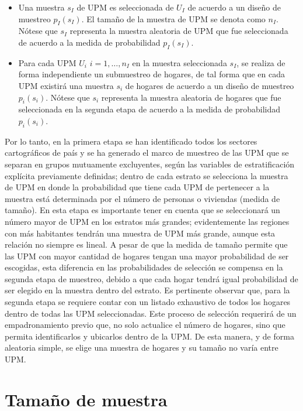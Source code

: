 \begin{itemize}
\tightlist
\item
  Una muestra \(s_I\) de UPM es seleccionada de \(U_I\) de acuerdo a un diseño de muestreo \(p_I(s_I)\). El tamaño de la muestra de UPM se denota como \(n_I\). Nótese que \(s_I\) representa la muestra aleatoria de UPM que fue seleccionada de acuerdo a la medida de probabilidad \(p_I(s_I)\).
\item
  Para cada UPM \(U_i\) \(i=1,\dots,n_I\) en la muestra seleccionada \(s_I\), se realiza de forma independiente un submuestreo de hogares, de tal forma que en cada UPM existirá una muestra \(s_i\) de hogares de acuerdo a un diseño de muestreo \(p_i(s_i)\). Nótese que \(s_i\) representa la muestra aleatoria de hogares que fue seleccionada en la segunda etapa de acuerdo a la medida de probabilidad \(p_i(s_i)\).
\end{itemize}

Por lo tanto, en la primera etapa se han identificado todos los sectores cartográficos de país y se ha generado el marco de muestreo de las UPM que se separan en grupos mutuamente excluyentes, según las variables de estratificación explícita previamente definidas; dentro de cada estrato se selecciona la muestra de UPM en donde la probabilidad que tiene cada UPM de pertenecer a la muestra está determinada por el número de personas o viviendas (medida de tamaño). En esta etapa es importante tener en cuenta que se seleccionará un número mayor de UPM en los estratos más grandes; evidentemente las regiones con más habitantes tendrán una muestra de UPM más grande, aunque esta relación no siempre es lineal. A pesar de que la medida de tamaño permite que las UPM con mayor cantidad de hogares tengan una mayor probabilidad de ser escogidas, esta diferencia en las probabilidades de selección se compensa en la segunda etapa de muestreo, debido a que cada hogar tendrá igual probabilidad de ser elegido en la muestra dentro del estrato. Es pertinente observar que, para la segunda etapa se requiere contar con un listado exhaustivo de todos los hogares dentro de todas las UPM seleccionadas. Este proceso de selección requerirá de un empadronamiento previo que, no solo actualice el número de hogares, sino que permita identificarlos y ubicarlos dentro de la UPM. De esta manera, y de forma aleatoria simple, se elige una muestra de hogares y su tamaño no varía entre UPM.

\hypertarget{tamano-de-muestra}{%
\chapter{Tamaño de muestra}\label{tamano-de-muestra}}

